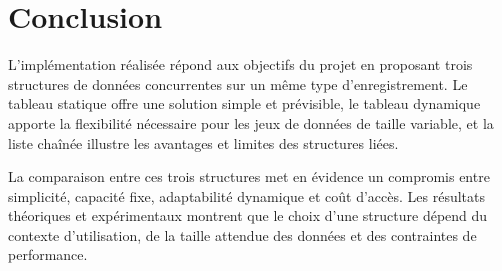 \documentclass[12pt,a4paper]{article}
\begin{document}
\section{Conclusion}
L’implémentation réalisée répond aux objectifs du projet en proposant trois structures de données concurrentes sur un même type d’enregistrement. Le tableau statique offre une solution simple et prévisible, le tableau dynamique apporte la flexibilité nécessaire pour les jeux de données de taille variable, et la liste chaînée illustre les avantages et limites des structures liées.

La comparaison entre ces trois structures met en évidence un compromis entre simplicité, capacité fixe, adaptabilité dynamique et coût d’accès. Les résultats théoriques et expérimentaux montrent que le choix d’une structure dépend du contexte d’utilisation, de la taille attendue des données et des contraintes de performance.
\end{document}
